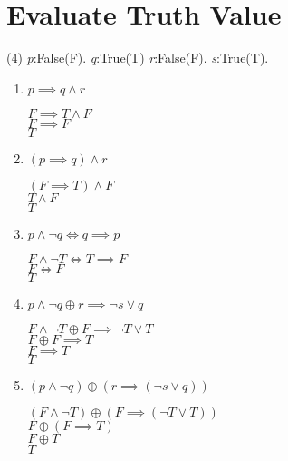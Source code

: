 \documentclass[a4paper]{article}
\begin{document}

\bigskip


\section{Evaluate Truth Value}
\begin{tasks}(4)
    \task \textit{p}:False(F).
    \task \textit{q}:True(T)
    \task \textit{r}:False(F).
    \task \textit{s}:True(T).
\end{tasks}
\begin{enumerate}
    \item \boldmath $p \implies q \land r$ \unboldmath
    
    $F \implies T \land F$\\
    $F \implies F$\\
    $T$
    \item \boldmath $(p \implies q) \land r$ \unboldmath
    
    $(F \implies T) \land F$\\
    $T \land F$\\
    $T$
    \item \boldmath $p \land \neg q \iff q \implies p$ \unboldmath
    
    $F \land \neg T \iff T \implies F$\\
    $F \iff F$\\
    $T$
    \item \boldmath $p \land \neg q \oplus r \implies \neg s \lor q$ \unboldmath
    
    $F \land \neg T \oplus F \implies \neg T \lor T$\\
    $F \oplus F \implies T$\\
    $F \implies T$\\
    $T$
    \item \boldmath $(p \land \neg q) \oplus (r \implies (\neg s \lor q))$ \unboldmath
    
    $(F \land \neg T) \oplus (F \implies (\neg T \lor T))$\\
    $F \oplus (F \implies T)$\\
    $F \oplus T$\\
    $T$
\end{enumerate}
\end{document}
